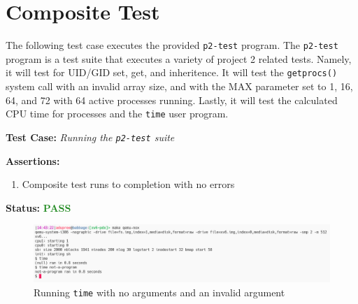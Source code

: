 \documentclass[11pt,letterpaper]{report}
\newcommand{\code}[1]{\colorbox{codegray}{\texttt{#1}}}
\begin{document}
{  \pagebreak

  \section*{Composite Test}
  The following test case executes the provided \code{p2-test} program. 
  The \code{p2-test} program is a test suite that executes a variety of project 2 related
  tests. Namely, it will test for UID/GID set, get, and inheritence. It will test the 
  \code{getprocs()} system call with an invalid array size, and with the MAX parameter
  set to 1, 16, 64, and 72 with 64 active processes running. Lastly, it will test the
  calculated CPU time for processes and the \code{time} user program. \hfill \break
  
  \noindent\textbf{Test Case:} \emph{Running the \code{p2-test} suite}
  
  \noindent\textbf{Assertions:}
  \begin{enumerate}[]
  \item Composite test runs to completion with no errors
  \end{enumerate}  
  
  \noindent\textbf{Status:} \textcolor{ForestGreen}{\textbf{PASS}}
  
  \begin{figure}[h!]
	\centering
	\includegraphics[width=1\linewidth]{time1.png}
	\caption[img]{Running \code{time} with no arguments and an invalid argument}
	\label{fig:P1compileP0-1}
  \end{figure}

\ifdefined \LF
} %
\fi
\end{document}

